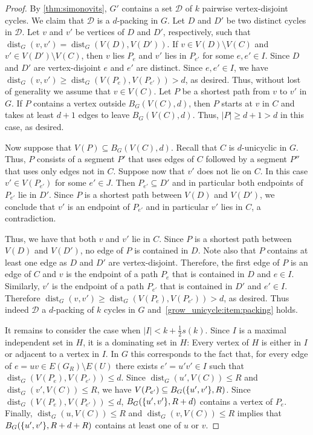 \documentclass{patmorin}
\DeclareMathOperator{\dist}{dist}
\DeclarePairedDelimiter\set{\{}{\}}
\begin{document}
\begin{proof}
  By \cref{thm:simonovits}, $G'$ contains a set $\mathcal{D}$ of $k$ pairwise vertex-disjoint cycles.
  We claim that $\mathcal{D}$ is a $d$-packing in $G$.
  Let $D$ and $D'$ be two distinct cycles in $\mathcal{D}$.
  Let $v$ and $v'$ be vertices of $D$ and $D'$, respectively,
  such that $\dist_G(v,v')=\dist_G(V(D),V(D'))$.
  If $v\in V(D)\setminus V(C)$ and $v'\in V(D')\setminus V(C)$, then
  $v$ lies $P_e$ and $v'$ lies in $P_{e'}$ for some  $e,e' \in I$.
  Since $D$ and $D'$ are vertex-disjoint $e$ and $e'$ are distinct.
  Since $e,e'\in I$, we have $\dist_G(v,v') \geq \dist_G(V(P_e),V(P_{e'}))>d$, as desired.
  Thus, without lost of generality we assume that $v \in V(C)$.
  Let $P$ be a shortest path from $v$ to $v'$ in $G$.
  If $P$ contains a vertex outside $B_G(V(C),d)$, then
  $P$ starts at $v$ in $C$ and takes at least $d+1$ edges to leave $B_G(V(C),d)$. %
  Thus, $|P|\geq d+1 > d$ in this case, as desired.
  
  Now suppose that $V(P)\subseteq B_G(V(C),d)$. 
  Recall that $C$ is $d$-unicyclic in $G$.
  Thus, $P$ consists of a segment $P'$ that uses edges of $C$ followed by a segment $P''$ that uses only edges not in $C$.
  Suppose now that $v'$ does not lie on $C$.
  In this case $v' \in V(P_{e'})$ for some $e'\in J$.
  Then $P_{e'}\subseteq D'$ and in particular both endpoints of $P_{e'}$ lie in $D'$.
  Since $P$ is a shortest path between $V(D)$ and $V(D')$,
  we conclude that $v'$ is an endpoint of $P_{e'}$ and in particular $v'$ lies in $C$, a contradiction.
  
  Thus, we have that both $v$ and $v'$ lie in $C$.
  Since $P$ is a shortest path between $V(D)$ and $V(D')$, no edge of $P$ is contained in $D$. Note also that $P$ contains at least one edge as $D$ and $D'$ are vertex-disjoint. Therefore, the first edge of $P$ is an edge of $C$ and $v$ is the endpoint of a path $P_e$ that is contained in $D$ and $e\in I$. Similarly, $v'$ is the endpoint of a path $P_{e'}$ that is contained in $D'$ and $e'\in I$. Therefore $\dist_G(v,v')\ge \dist_G(V(P_e),V(P_{e'}))>d$, as desired.
  Thus indeed $\mathcal{D}$ a $d$-packing of  $k$ cycles in $G$ and~\eqref{grow_unicycle:item:packing} holds.

  It remains to consider the case when $|I| < k+\frac{1}{2}s(k)$.
  Since $I$ is a maximal independent set in $H$, it is a dominating set in $H$: Every vertex of $H$ is either in $I$ or adjacent to a vertex in $I$.  In $G$ this corresponds to the fact that, for every edge of $e=uv\in E(G_R)\setminus E(U)$ there exists $e'=u'v'\in I$ such that $\dist_G(V(P_{e}),V(P_{e'}))\le d$.
  Since $\dist_G(u',V(C))\leq R$ and $\dist_G(v',V(C))\leq R$,
  we have $V(P_{e'}) \subseteq B_G(\set{u',v'},R)$. Since $\dist_G(V(P_e),V(P_{e'}))\le d$,  $B_G(\set{u',v'},R+d)$ contains a vertex of $P_e$.
  Finally, $\dist_G(u,V(C))\leq R$ and $\dist_G(v,V(C))\leq R$ implies that
  $B_{G}(\set{u',v'},R+d+R)$ contains at least one of $u$ or $v$.  
\end{proof}
\end{document}
